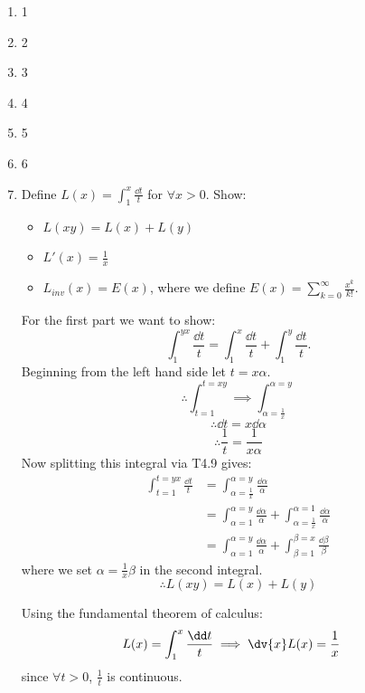 \pagestyle{fancy}
\fancyhead{}

\begin{enumerate}
    \item 1
    \item 2
    \item 3
    \item 4
    \item 5
    \item 6
    \newpage
    \item Define $L(x)=\displaystyle\int_{1}^{x}\frac{\dd t}{t}$
    for $\forall x>0$. Show:
    \begin{itemize}
        \item $L(xy)=L(x)+L(y)$
        \item $L'(x)=\displaystyle\frac{1}{x}$
        \item $L_{inv}(x)=E(x)$, where we define
        $E(x)=\displaystyle\sum_{k=0}^{\infty}\frac{x^k}{k!}$. \\
    \end{itemize}

    For the first part we want to show:
    $$\int_{1}^{yx}\frac{\dd t}{t}=\int_{1}^{x}\frac{\dd t}{t}
    +\int_{1}^{y}\frac{\dd t}{t}.$$
    Beginning from the left hand side let $t=x\alpha$.
    $$\therefore\int_{t=1}^{t=xy}\implies
    \int_{\alpha=\frac{1}{x}}^{\alpha=y}$$
    $$\therefore\dd t=x\dd \alpha$$
    $$\therefore\frac{1}{t}=\frac{1}{x\alpha}$$
    Now splitting this integral via T4.9 gives:
    \begin{align*}
        \int_{t=1}^{t=yx}\frac{\dd t}{t}
        &=\int_{\alpha=\frac{1}{x}}^{\alpha=y}
        \frac{\dd\alpha}{\alpha} \\
        &=\int_{\alpha=1}^{\alpha=y}
        \frac{\dd\alpha}{\alpha}+
        \int_{\alpha=\frac{1}{x}}^{\alpha=1}
        \frac{\dd\alpha}{\alpha} \\
        &=\int_{\alpha=1}^{\alpha=y}
        \frac{\dd\alpha}{\alpha}+
        \int_{\beta=1}^{\beta=x}
        \frac{\dd\beta}{\beta}
    \end{align*}
    where we set $\alpha=\frac{1}{x}\beta$ in the second integral.
    $$\therefore L(xy)=L(x)+L(y)$$

    Using the fundamental theorem of calculus:
    \begin{align*}
        L(x)=\displaystyle\int_{1}^{x}\frac{\dd t}{t}
        &\implies \dv{x}L(x)=\frac{1}{x}
    \end{align*}
    since $\forall t>0$, $\frac{1}{t}$ is continuous.


\end{enumerate}
